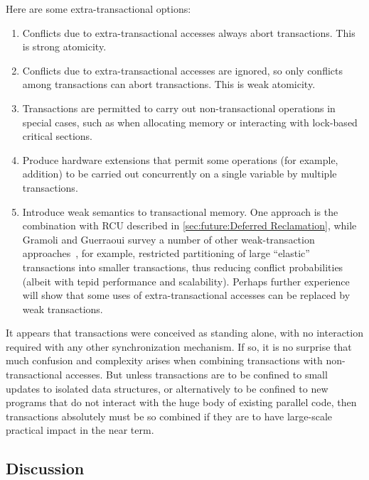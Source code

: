 Here are some extra-transactional options:

\begin{enumerate}
\item	Conflicts due to extra-transactional accesses always abort
	transactions.
	This is strong atomicity.
\item	Conflicts due to extra-transactional accesses are ignored,
	so only conflicts among transactions can abort transactions.
	This is weak atomicity.
\item	Transactions are permitted to carry out non-transactional
	operations in special cases, such as when allocating memory or
	interacting with lock-based critical sections.
\item	Produce hardware extensions that permit some operations
	(for example, addition) to be carried out concurrently on a
	single variable by multiple transactions.
\item	Introduce weak semantics to transactional memory.
	One approach is the combination with RCU described in
	\cref{sec:future:Deferred Reclamation},
	while Gramoli and Guerraoui
	survey a number of other weak-transaction
	approaches~\cite{Gramoli:2014:DTP:2541883.2541900}, for example,
	restricted partitioning of large
	``elastic'' transactions into smaller transactions, thus
	reducing conflict probabilities (albeit with tepid performance
	and scalability).
	Perhaps further experience will show that some uses of
	extra-transactional accesses can be replaced by weak
	transactions.
\end{enumerate}

It appears that transactions were conceived as standing alone, with no
interaction required with any other synchronization mechanism.
If so, it is no surprise that much confusion and complexity arises when
combining transactions with non-transactional accesses.
But unless transactions are to be confined to small updates to isolated
data structures, or alternatively to be confined to new programs
that do not interact with the huge body of existing parallel code,
then transactions absolutely must be so combined if they are to have
large-scale practical impact in the near term.


\subsection{Discussion}
\label{sec:future:Discussion}

